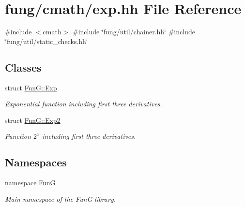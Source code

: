 \hypertarget{exp_8hh}{\section{fung/cmath/exp.hh \-File \-Reference}
\label{exp_8hh}
}
{\ttfamily \#include $<$cmath$>$}\*
{\ttfamily \#include \char`\"{}fung/util/chainer.\-hh\char`\"{}}\*
{\ttfamily \#include \char`\"{}fung/util/static\-\_\-checks.\-hh\char`\"{}}\*
\subsection*{\-Classes}
\begin{DoxyCompactItemize}
\item 
struct \hyperlink{structFunG_1_1Exp}{\-Fun\-G\-::\-Exp}
\begin{DoxyCompactList}\small\item\em \-Exponential function including first three derivatives. \end{DoxyCompactList}\item 
struct \hyperlink{structFunG_1_1Exp2}{\-Fun\-G\-::\-Exp2}
\begin{DoxyCompactList}\small\item\em \-Function $2^x$ including first three derivatives. \end{DoxyCompactList}\end{DoxyCompactItemize}
\subsection*{\-Namespaces}
\begin{DoxyCompactItemize}
\item 
namespace \hyperlink{namespaceFunG}{\-Fun\-G}
\begin{DoxyCompactList}\small\item\em \-Main namespace of the \-Fun\-G library. \end{DoxyCompactList}\end{DoxyCompactItemize}
